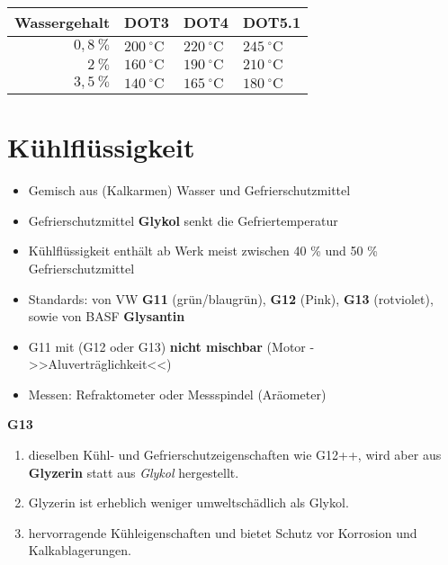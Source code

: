 \begin{table}[!ht]%
\centering 
	\caption{}%
\begin{tabular}{@{}rlll@{}}
\hline
\textbf{Wassergehalt} & \textbf{DOT3} & \textbf{DOT4} &
\textbf{DOT5.1} \\
\hline
$0,8~\%$ & $200~^\circ\text{C}$ & $220~^\circ\text{C}$ &
$245~^\circ\text{C}$ \\
$2~\%$ & $160~^\circ\text{C}$ & $190~^\circ\text{C}$ &
$210~^\circ\text{C}$ \\
$3,5~\%$ & $140~^\circ\text{C}$ & $165~^\circ\text{C}$ &
$180~^\circ\text{C}$ \\
\hline
\end{tabular} 
\end{table}

\section{Kühlflüssigkeit}\label{kuehlfluessigkeit}

\begin{itemize}
\item
  Gemisch aus (Kalkarmen) Wasser und Gefrierschutzmittel
\item
  Gefrierschutzmittel \textbf{Glykol} senkt die Gefriertemperatur
\item
  Kühlflüssigkeit enthält ab Werk meist zwischen 40 \% und 50 \%
  Gefrierschutzmittel
\item
  Standards: von VW \textbf{G11} (grün/blaugrün), \textbf{G12} (Pink),
  \textbf{G13} (rotviolet), sowie von BASF \textbf{Glysantin}
\item
  G11 mit (G12 oder G13) \textbf{nicht mischbar} (Motor -
  >>Aluverträglichkeit<<)
\item
  Messen: Refraktometer oder Messspindel (Aräometer)
\end{itemize}

\textbf{G13}

\begin{enumerate}
\item
  dieselben Kühl- und Gefrierschutzeigenschaften wie G12++, wird aber
  aus \textbf{Glyzerin} statt aus \emph{Glykol} hergestellt.
\item
  Glyzerin ist erheblich weniger umweltschädlich als Glykol.
\item
  hervorragende Kühleigenschaften und bietet Schutz vor Korrosion und
  Kalkablagerungen.
\end{enumerate}

